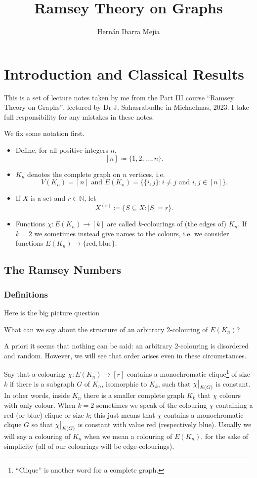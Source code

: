 \documentclass{report}
\theoremstyle{definition}
\theoremstyle{plain}
\theoremstyle{definition}
\newcommand\restr[2]{{%
		\left.\kern-\nulldelimiterspace %
		#1 %
		\vphantom{\big|} %
		\right|_{#2} %
}}
\begin{document}
	\title{Ramsey Theory on Graphs}
	\author{Hernán Ibarra Mejia}
	\maketitle
	
	\chapter{Introduction and Classical Results}
	This is a set of lecture notes taken by me from the Part III course ``Ramsey Theory on Graphs'', lectured by Dr J. Sahasrabudhe in Michaelmas, 2023. I take full responsibility for any mistakes in these notes.
	
	We fix some notation first. 
	\begin{itemize}
		\item Define, for all positive integers $n$,
		\[[n]\coloneqq \{1,2,\ldots, n\}.\]
		\item $K_n$ denotes the complete graph on $n$ vertices, i.e. 
		\[
			V(K_n)= [n] \text{ and }E(K_n) = \{\{i,j\} \colon i\neq j \text{ and }i,j\in [n]\}.
		\] 
		\item If $X$ is a set and $r\in \mathbb{N}$, let
		\[
			X^{(r)} \coloneqq \{S\subseteq X \colon |S| = r\}.
		\]
		\item Functions $\chi\colon E(K_n) \to [k]$ are called $k$-colourings of (the edges of) $K_n$.  If $k = 2$ we sometimes instead give names to the colours, i.e. we consider functions $E(K_n) \to \{\text{red}, \text{blue}\}$.
	\end{itemize}
	\section{The Ramsey Numbers}
	\subsection{Definitions}
	Here is the big picture question
	\begin{center}
		What can we say about the structure of an arbitrary 2-colouring of $E(K_n)$?
	\end{center}
	A priori it seems that nothing can be said: an arbitrary 2-colouring is disordered and random. However, we will see that order arises even in these circumstances. 
	
	Say that a colouring $\chi \colon E(K_n) \to [r]$ contains a monochromatic clique\footnote{``Clique'' is another word for a complete graph.} of size $k$ if there is a subgraph $G$ of $K_n$, isomorphic to $K_k$, such that $\restr{\chi}{E(G)}$ is constant. In other words, inside $K_n$ there is a smaller complete graph $K_k$ that $\chi$ colours with only colour. When $k=2$ sometimes we speak of the colouring $\chi$ containing a red (or blue) clique or size $k$; this just means that $\chi$ contains a monochromatic clique $G$ so that $\restr{\chi}{E(G)}$ is constant with value red (respectively blue). Usually we will say a colouring of $K_n$ when we mean a colouring of $E(K_n)$, for the sake of simplicity (all of our colourings will be edge-colourings).
	
\end{document}
